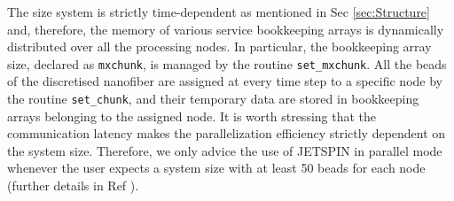 The size system is strictly time-dependent as mentioned in Sec \ref{sec:Structure}
and, therefore, the memory of various service bookkeeping arrays is
dynamically distributed over all the processing nodes. In particular,
the bookkeeping array size, declared as \texttt{mxchunk}, is managed
by the routine \texttt{set\_mxchunk}. All the beads of the discretised
nanofiber are assigned at every time step to a specific node by the
routine \texttt{set\_chunk}, and their temporary data are stored in
bookkeeping arrays belonging to the assigned node. It is worth stressing
that the communication latency makes the parallelization efficiency
strictly dependent on the system size. Therefore, we only advice the
use of JETSPIN in parallel mode whenever the user expects a system
size with at least 50 beads for each node (further details in Ref
\cite{lauricella2015jetspin}).
